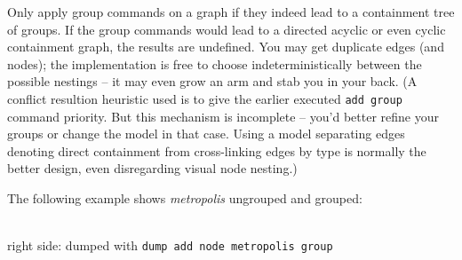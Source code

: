 \begin{note}
Only apply group commands on a graph if they indeed lead to a containment tree of groups.
If the group commands would lead to a directed acyclic or even cyclic containment graph, the results are undefined.
You may get duplicate edges (and nodes); the implementation is free to choose indeterministically between the possible nestings -- it may even grow an arm and stab you in your back.
(A conflict resultion heuristic used is to give the earlier executed \texttt{add group} command priority. 
But this mechanism is incomplete -- you'd better refine your groups or change the model in that case.
Using a model separating edges denoting direct containment from cross-linking edges by type is normally the better design, even disregarding visual node nesting.)
\end{note}

The following example shows \emph{metropolis} ungrouped and grouped:
\begin{center}
    \hfill {}\\
  {\small right side: dumped with \texttt{dump add node metropolis group}}
\end{center}

